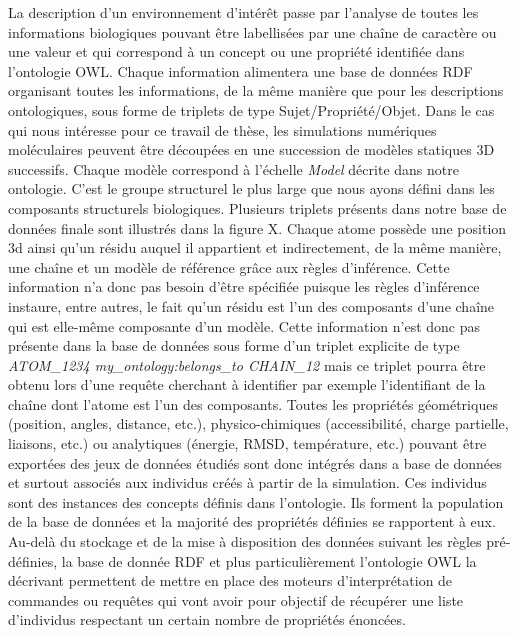 La description d'un environnement d'intérêt passe par l'analyse de toutes les informations biologiques pouvant être labellisées par une chaîne de caractère ou une valeur et qui correspond à un concept ou une propriété identifiée dans l'ontologie OWL. Chaque information alimentera une base de données RDF organisant toutes les informations, de la même manière que pour les descriptions ontologiques, sous forme de triplets de type Sujet/Propriété/Objet.
Dans le cas qui nous intéresse pour ce travail de thèse, les simulations numériques moléculaires peuvent être découpées en une succession de modèles statiques 3D successifs. Chaque modèle correspond à l'échelle \textit{Model} décrite dans notre ontologie. C'est le groupe structurel le plus large que nous ayons défini dans les composants structurels biologiques. Plusieurs triplets présents dans notre base de données finale sont illustrés dans la figure X. Chaque atome possède une position 3d ainsi qu'un résidu auquel il appartient et indirectement, de la même manière, une chaîne et un modèle de référence grâce aux règles d'inférence. Cette information n'a donc pas besoin d'être spécifiée puisque les règles d'inférence instaure, entre autres, le fait qu'un résidu est l'un des composants d'une chaîne qui est elle-même composante d'un modèle. Cette information n'est donc pas présente dans la base de données sous forme d'un triplet explicite de type \textit{ATOM\_1234 my\_ontology:belongs\_to CHAIN\_12} mais ce triplet pourra être obtenu lors d'une requête cherchant à identifier par exemple l'identifiant de la chaîne dont l'atome est l'un des composants. Toutes les propriétés géométriques (position, angles, distance, etc.), physico-chimiques (accessibilité, charge partielle, liaisons, etc.) ou analytiques (énergie, RMSD, température, etc.) pouvant être exportées des jeux de données étudiés sont donc intégrés dans a base de données et surtout associés aux individus créés à partir de la simulation. Ces individus sont des instances des concepts définis dans l'ontologie. Ils forment la population de la base de données et la majorité des propriétés définies se rapportent à eux.
Au-delà du stockage et de la mise à disposition des données suivant les règles pré-définies, la base de donnée RDF et plus particulièrement l'ontologie OWL la décrivant permettent de mettre en place des moteurs d'interprétation de commandes ou requêtes qui vont avoir pour objectif de récupérer une liste d'individus respectant un certain nombre de propriétés énoncées.

